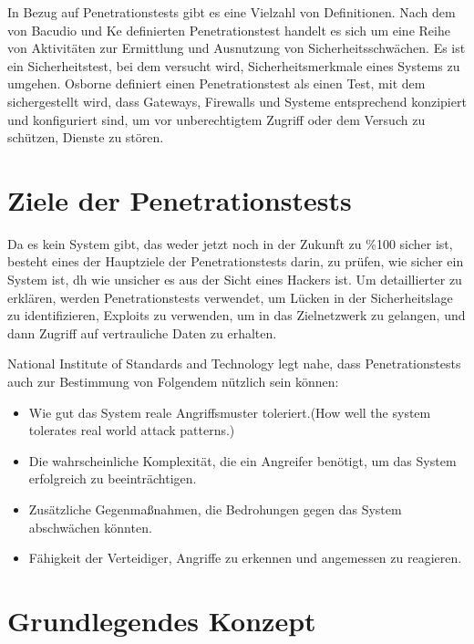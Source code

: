 In Bezug auf Penetrationstests gibt es eine Vielzahl von Definitionen. Nach dem von Bacudio\cite{bacudio2011overview} und Ke\cite{ke2009using} definierten Penetrationstest handelt es sich um eine Reihe von Aktivitäten zur Ermittlung und Ausnutzung von Sicherheitsschwächen. Es ist ein Sicherheitstest, bei dem versucht wird, Sicherheitsmerkmale eines Systems zu umgehen\cite{wack2003guideline}. Osborne definiert einen Penetrationstest als einen Test, mit dem sichergestellt wird, dass Gateways, Firewalls und Systeme entsprechend konzipiert und konfiguriert sind, um vor unberechtigtem Zugriff oder dem Versuch zu schützen, Dienste zu stören\cite{osborne2006cheat}.

\section{Ziele der Penetrationstests}

Da es kein System gibt, das weder jetzt noch in der Zukunft zu \%100 sicher ist, besteht eines der Hauptziele der Penetrationstests darin, zu prüfen, wie sicher ein System ist, dh wie unsicher es aus der Sicht eines Hackers ist. Um detaillierter zu erklären, werden Penetrationstests verwendet, um Lücken in der Sicherheitslage zu identifizieren, Exploits zu verwenden, um in das Zielnetzwerk zu gelangen, und dann Zugriff auf vertrauliche Daten zu erhalten\cite{yeo2013using}.

National Institute of Standards and Technology legt nahe, dass Penetrationstests auch zur Bestimmung von Folgendem nützlich sein können\cite{scarfone2008technical}: 

\begin{itemize}
	\item Wie gut das System reale Angriffsmuster toleriert.{\color{red}(How well the system tolerates real world attack patterns.)}
	\item Die wahrscheinliche Komplexität, die ein Angreifer benötigt, um das System erfolgreich zu beeinträchtigen.
	\item Zusätzliche Gegenmaßnahmen, die Bedrohungen gegen das System abschwächen könnten.
	\item Fähigkeit der Verteidiger, Angriffe zu erkennen und angemessen zu reagieren.
\end{itemize}

\section{Grundlegendes Konzept}

